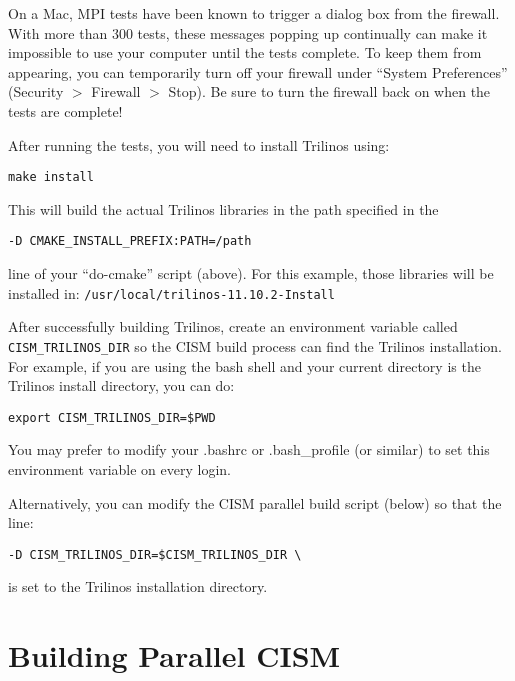 \begin{mdframed}[style=mac] %
On a Mac, MPI tests have been known to trigger a dialog box from the firewall. 
With more than 300 tests, these messages popping up continually can make it impossible 
to use your computer until the tests complete. To keep them from appearing, you can temporarily 
turn off your firewall under ``System Preferences'' (Security $>$ Firewall $>$ Stop). 
Be sure to turn the firewall back on when the tests are complete!
\end{mdframed}              %

After running the tests, you will need to install Trilinos using:

 \texttt{make install}

\noindent
This will build the actual Trilinos libraries in the path specified in the

\begin{verbatim}
-D CMAKE_INSTALL_PREFIX:PATH=/path
\end{verbatim} 

\noindent
line of your ``do-cmake'' script (above). For this example, those libraries will be 
installed in: \texttt{/usr/local/trilinos-11.10.2-Install}

After successfully building Trilinos, create an environment variable called \texttt{CISM\_TRILINOS\_DIR}
so the CISM build process can find the Trilinos installation.  For example, if you 
are using the bash shell and your current directory is the Trilinos install directory, you can do:
\begin{verbatim}
export CISM_TRILINOS_DIR=$PWD
\end{verbatim}
You may prefer to modify your .bashrc or .bash\_profile (or similar)
to set this environment variable on every login.

Alternatively, you can modify the CISM parallel build script (below) so that the line:
\begin{verbatim}
-D CISM_TRILINOS_DIR=$CISM_TRILINOS_DIR \
\end{verbatim}
is set to the Trilinos installation directory.





\section{Building Parallel CISM}

